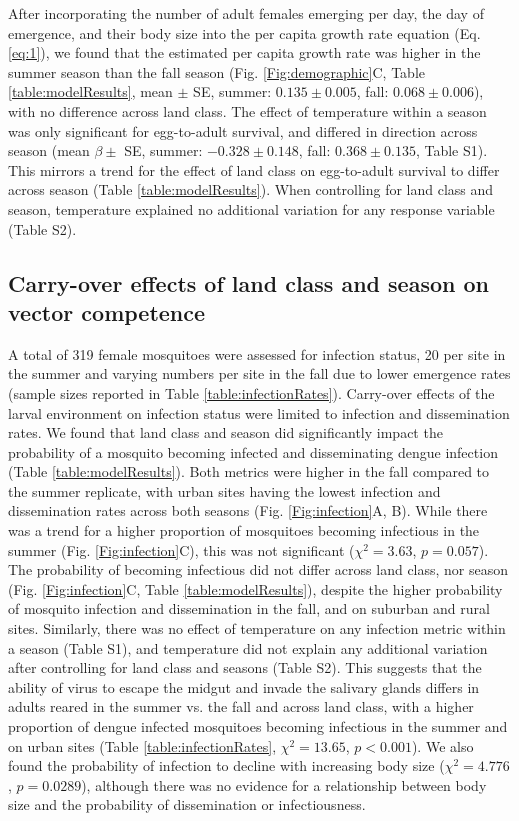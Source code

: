 \documentclass[12pt]{article}
\begin{document}
After incorporating the number of adult females emerging per day, the day of emergence, and their body size into the per capita growth rate equation (Eq. \ref{eq:1}), we found that the estimated per capita growth rate was higher in the summer season than the fall season (Fig. \ref{Fig:demographic}C, Table \ref{table:modelResults}, mean $\pm$ SE, summer: $0.135 \pm 0.005$, fall: $0.068 \pm 0.006$), with no difference across land class.
The effect of temperature within a season was only significant for egg-to-adult survival, and differed in direction across season (mean $\beta \pm$ SE, summer: $-0.328 \pm 0.148$, fall: $0.368 \pm 0.135$, Table S1).
This mirrors a trend for the effect of land class on egg-to-adult survival to differ across season (Table \ref{table:modelResults}).
When controlling for land class and season, temperature explained no additional variation for any response variable (Table S2).

\subsection*{Carry-over effects of land class and season on vector competence}

A total of 319 female mosquitoes were assessed for infection status, 20 per site in the summer and varying numbers per site in the fall due to lower emergence rates (sample sizes reported in Table \ref{table:infectionRates}).
Carry-over effects of the larval environment on infection status were limited to infection and dissemination rates.
We found that land class and season did significantly impact the probability of a mosquito becoming infected and disseminating dengue infection (Table \ref{table:modelResults}).
Both metrics were higher in the fall compared to the summer replicate, with urban sites having the lowest infection and dissemination rates across both seasons (Fig. \ref{Fig:infection}A, B).
While there was a trend for a higher proportion of mosquitoes becoming infectious in the summer (Fig. \ref{Fig:infection}C), this was not significant ($\chi^2=3.63$, $p = 0.057$).
The probability of becoming infectious did not differ across land class, nor season (Fig. \ref{Fig:infection}C, Table \ref{table:modelResults}), despite the higher probability of mosquito infection and dissemination in the fall, and on suburban and rural sites.
Similarly, there was no effect of temperature on any infection metric within a season (Table S1), and temperature did not explain any additional variation after controlling for land class and seasons (Table S2).
This suggests that the ability of virus to escape the midgut and invade the salivary glands differs in adults reared in the summer vs. the fall and across land class, with a higher proportion of dengue infected mosquitoes becoming infectious in the summer and on urban sites (Table \ref{table:infectionRates}, $\chi^2=13.65$, $p<0.001$).
We also found the probability of infection to decline with increasing body size ($\chi^2=4.776$, $p=0.0289$), although there was no evidence for a relationship between body size and the probability of dissemination or infectiousness.
\end{document}
